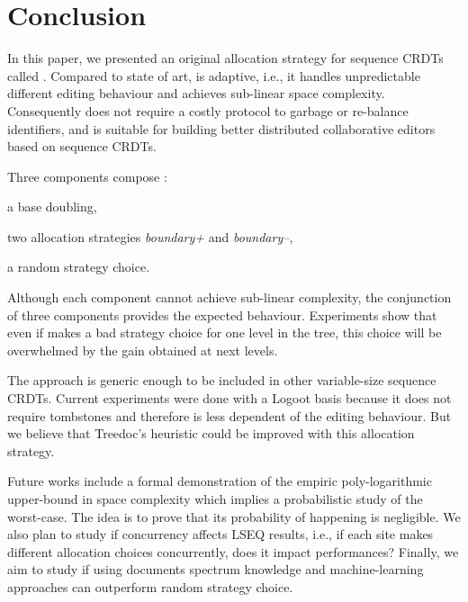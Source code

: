 \section{Conclusion}

In this paper, we presented an original allocation strategy for sequence CRDTs
called \NAME{}. Compared to state of art, \NAME{} is adaptive, i.e., it handles
unpredictable different editing behaviour and achieves sub-linear space
complexity. Consequently \NAME{} does not require a costly protocol to garbage
or re-balance identifiers, and is suitable for building better distributed
collaborative editors based on sequence CRDTs.

Three components compose \NAME{}:
\begin{inparaenum}[(1)]
  \item a base doubling,
  \item two allocation strategies \emph{boundary+} and \emph{boundary--},
  \item a random strategy choice.
\end{inparaenum}

Although each component cannot achieve sub-linear complexity, the conjunction
of three components provides the expected behaviour. Experiments show that
even if \NAME{} makes a bad strategy choice for one level in the tree, this
choice will be overwhelmed by the gain obtained at next levels.


The \NAME{} approach is generic enough to be included in other variable-size
sequence CRDTs. Current experiments were done with a Logoot basis because it
does not require tombstones and therefore is less dependent of the editing
behaviour. But we believe that Treedoc's heuristic could be improved with this
allocation strategy.

Future works include a formal demonstration of the empiric poly-logarithmic
upper-bound in space complexity which implies a probabilistic study of the
worst-case. The idea is to prove that its probability of happening is
negligible. We also plan to study if concurrency affects LSEQ results, i.e., if
each site makes different allocation choices concurrently, does it impact
\NAME{} performances? Finally, we aim to study if using documents spectrum
knowledge and machine-learning approaches can outperform random strategy
choice.
